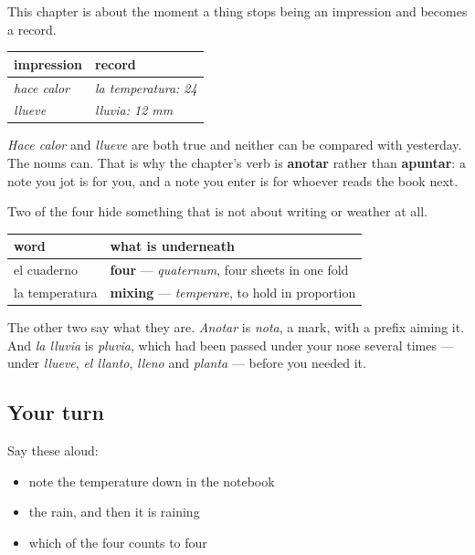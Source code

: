 \begin{grammarlens}[title={Grammar Lens: an impression is not a record}]
This chapter is about the moment a thing stops being an impression and becomes a record.

\noindent
\begin{tabularx}{\linewidth}{@{}>{\raggedright\arraybackslash}X>{\raggedright\arraybackslash}X@{}}
\toprule
\textbf{impression} & \textbf{record} \\
\midrule
\emph{hace calor} & \emph{la temperatura: 24} \\
\emph{llueve} & \emph{lluvia: 12 mm} \\
\bottomrule
\end{tabularx}

\emph{Hace calor} and \emph{llueve} are both true and neither can be compared with yesterday. The nouns can. That is why the chapter's verb is \textbf{anotar} rather than \textbf{apuntar}: a note you jot is for you, and a note you enter is for whoever reads the book next.
\end{grammarlens}

\begin{cousinweb}
Two of the four hide something that is not about writing or weather at all.

\noindent
\begin{tabularx}{\linewidth}{@{}>{\raggedright\arraybackslash}X>{\raggedright\arraybackslash}X@{}}
\toprule
\textbf{word} & \textbf{what is underneath} \\
\midrule
el cuaderno & \textbf{four} — \emph{quaternum}, four sheets in one fold \\
la temperatura & \textbf{mixing} — \emph{temperare}, to hold in proportion \\
\bottomrule
\end{tabularx}

The other two say what they are. \emph{Anotar} is \emph{nota}, a mark, with a prefix aiming it. And \emph{la lluvia} is \emph{pluvia}, which had been passed under your nose several times — under \emph{llueve}, \emph{el llanto}, \emph{lleno} and \emph{planta} — before you needed it.
\end{cousinweb}

\subsection*{Your turn}
Say these aloud:

\begin{itemize}
\raggedright
  \item note the temperature down in the notebook
  \item the rain, and then it is raining
  \item which of the four counts to four
\end{itemize}

